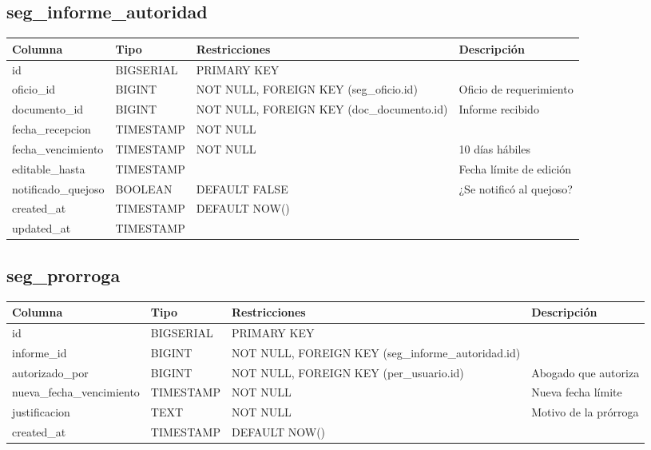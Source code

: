 \documentclass[12pt, a4paper]{article}
\begin{document}
\subsection{seg\_informe\_autoridad}
\begin{longtable}{|p{3.5cm}|p{2.5cm}|p{3cm}|p{5cm}|}
    \hline
    \rowcolor[gray]{0.9}
    \textbf{Columna} & \textbf{Tipo} & \textbf{Restricciones} & \textbf{Descripción} \\
    \hline
    id & BIGSERIAL & PRIMARY KEY & \\
    \hline
    oficio\_id & BIGINT & NOT NULL, FOREIGN KEY (seg\_oficio.id) & Oficio de requerimiento \\
    \hline
    documento\_id & BIGINT & NOT NULL, FOREIGN KEY (doc\_documento.id) & Informe recibido \\
    \hline
    fecha\_recepcion & TIMESTAMP & NOT NULL & \\
    \hline
    fecha\_vencimiento & TIMESTAMP & NOT NULL & 10 días hábiles \\
    \hline
    editable\_hasta & TIMESTAMP & & Fecha límite de edición \\
    \hline
    notificado\_quejoso & BOOLEAN & DEFAULT FALSE & ¿Se notificó al quejoso? \\
    \hline
    created\_at & TIMESTAMP & DEFAULT NOW() & \\
    \hline
    updated\_at & TIMESTAMP & & \\
    \hline
\end{longtable}

\subsection{seg\_prorroga}
\begin{longtable}{|p{3.5cm}|p{2.5cm}|p{3cm}|p{5cm}|}
    \hline
    \rowcolor[gray]{0.9}
    \textbf{Columna} & \textbf{Tipo} & \textbf{Restricciones} & \textbf{Descripción} \\
    \hline
    id & BIGSERIAL & PRIMARY KEY & \\
    \hline
    informe\_id & BIGINT & NOT NULL, FOREIGN KEY (seg\_informe\_autoridad.id) & \\
    \hline
    autorizado\_por & BIGINT & NOT NULL, FOREIGN KEY (per\_usuario.id) & Abogado que autoriza \\
    \hline
    nueva\_fecha\_vencimiento & TIMESTAMP & NOT NULL & Nueva fecha límite \\
    \hline
    justificacion & TEXT & NOT NULL & Motivo de la prórroga \\
    \hline
    created\_at & TIMESTAMP & DEFAULT NOW() & \\
    \hline
\end{longtable}
\end{document}
